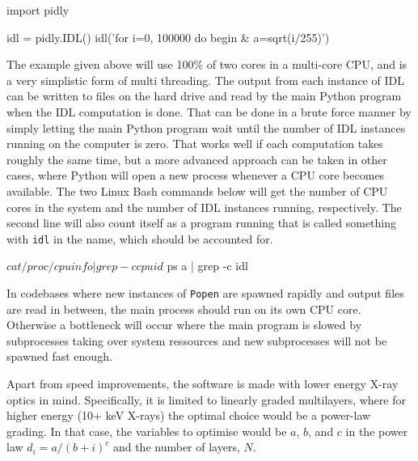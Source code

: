 \begin{verbcode}
import pidly

idl = pidly.IDL()
idl('for i=0, 100000 do begin & a=sqrt(i/255)')
\end{verbcode}

The example given above will use 100\% of two cores in a multi-core CPU, and is a very simplistic form of multi threading. The output from each instance of IDL can be written to files on the hard drive and read by the main Python program when the IDL computation is done. That can be done in a brute force manner by simply letting the main Python program wait until the number of IDL instances running on the computer is zero. That works well if each computation takes roughly the same time, but a more advanced approach can be taken in other cases, where Python will open a new process whenever a CPU core becomes available. The two Linux Bash commands below will get the number of CPU cores in the system and the number of IDL instances running, respectively. The second line will also count itself as a program running that is called something with \verb|idl| in the name, which should be accounted for.

\begin{verbcode}
  $ cat /proc/cpuinfo | grep -c cpuid

  $ ps a | grep -c idl
\end{verbcode}

In codebases where new instances of \verb|Popen| are spawned rapidly and output files are read in between, the main process should run on its own CPU core. Otherwise a bottleneck will occur where the main program is slowed by subprocesses taking over system ressources and new subprocesses will not be spawned fast enough.

Apart from speed improvements, the software is made with lower energy X-ray optics in mind. Specifically, it is limited to linearly graded multilayers, where for higher energy (10+ keV X-rays) the optimal choice would be a power-law grading. In that case, the variables to optimise would be $a$, $b$, and $c$ in the power law $d_i = a/(b+i)^c$ and the number of layers, $N$.
